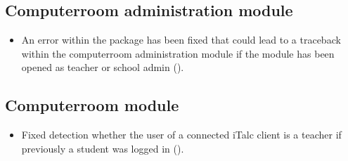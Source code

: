 
\subsection{Computerroom administration module}
\begin{itemize}
\item An error within the package  has been fixed that could lead to a traceback
  within the computerroom administration module if the module has been opened as teacher or school admin ().
\end{itemize}

\subsection{Computerroom module}
\begin{itemize}
\item Fixed detection whether the user of a connected iTalc client is a teacher if previously a student was logged in ().
\end{itemize}




